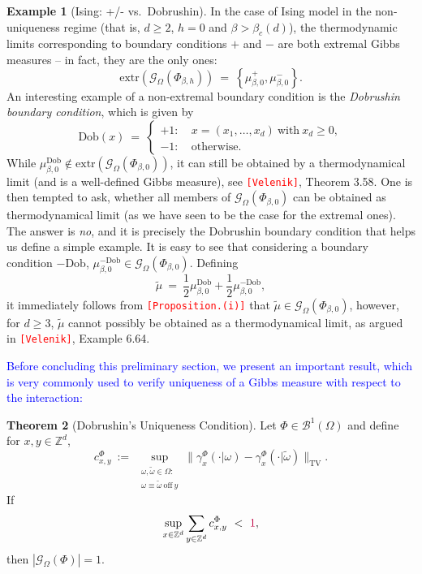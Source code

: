 \documentclass[12pt]{article}
\newcommand{\BB}{\mathscr{B}}
\newcommand{\G}{\mathcal{G}}
\newcommand{\Z}{\mathbb{Z}}
\newcommand{\TV}{\mathrm{TV}}
\newcommand{\set}[1]{\left\{#1\right\}}
\newcommand{\pika}{\boldsymbol{\cdot}}
\newcommand{\1}{\mathbbm{1}}
\newcommand{\5}{\vspace{0.5cm}}
\renewcommand{\tilde}{\widetilde}
\theoremstyle{definition}
\newtheorem{thm}{Theorem}[section]
\newtheorem{ex}[thm]{Example}
\begin{document}
\begin{ex}[Ising: +/- vs.~Dobrushin]
In the case of Ising model in the non-uniqueness regime (that is, $d\geq 2$, $h=0$ and $\beta>\beta_c(d)$), the thermodynamic limits corresponding to boundary conditions $+$ and $-$ are both extremal Gibbs measures -- in fact, they are the only ones:
$$\mathrm{extr}(\G_\Omega(\Phi_{\beta,h})) ~=~ \set{\mu_{\beta,0}^+,\mu_{\beta,0}^-}.$$
An interesting example of a non-extremal boundary condition is the \textit{Dobrushin boundary condition}, which is given by
$$\mathrm{Dob}(x) ~=~ \begin{cases}
+1: ~&x=(x_1,\ldots,x_d)~\text{with}~x_d\geq 0,\\
-1: ~&\text{otherwise}. 
\end{cases}$$
While $\mu_{\beta,0}^{\mathrm{Dob}}\notin\mathrm{extr}(\G_\Omega(\Phi_{\beta,0}))$, it can still be obtained by a thermodynamical limit (and is a well-defined Gibbs measure), see \textcolor{red}{\texttt{[Velenik]}}, Theorem 3.58. One is then tempted to ask, whether all members of $\G_\Omega(\Phi_{\beta,0})$ can be obtained as thermodynamical limit (as we have seen to be the case for the extremal ones). The answer is \textit{no}, and it is precisely the Dobrushin boundary condition that helps us define a simple example. It is easy to see that considering a boundary condition $-\mathrm{Dob}$, $\mu_{\beta,0}^{-\mathrm{Dob}}\in\G_\Omega(\Phi_{\beta,0})$. Defining
$$\tilde{\mu} ~=~ \frac{1}{2}\mu_{\beta,0}^{\mathrm{Dob}} + \frac{1}{2}\mu_{\beta,0}^{-\mathrm{Dob}},$$
it immediately follows from \textcolor{red}{\texttt{[Proposition.(i)]}} that $\tilde{\mu}\in\G_{\Omega}(\Phi_{\beta,0})$, however, for $d\geq 3$, $\tilde{\mu}$ cannot possibly be obtained as a thermodynamical limit, as argued in \textcolor{red}{\texttt{[Velenik]}}, Example 6.64.
\end{ex}

\textcolor{blue}{Before concluding this preliminary section, we present an important result, which is very commonly used to verify uniqueness of a Gibbs measure with respect to the interaction:}
\begin{thm}[Dobrushin's Uniqueness Condition]
Let $\Phi\in\BB^1(\Omega)$ and define for $x,y\in\Z^d$,
$$c_{x,y}^\Phi ~:=~ \sup_{\substack{\omega,\tilde{\omega}\in\Omega:\\\omega\equiv\tilde{\omega}~\text{off}~ y}}\|\gamma_x^\Phi(\pika|\omega)-\gamma_x^\Phi(\pika|\tilde{\omega})\|_\TV.$$
If
$$\sup_{x\in\Z^d}\sum_{y\in\Z^d}c_{x,y}^\Phi ~<~ \textcolor{purple}{1},$$
then $|\G_\Omega(\Phi)|=1$.
\end{thm}
\end{document}
